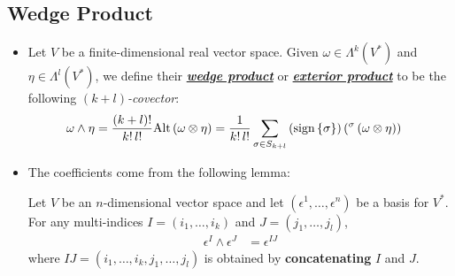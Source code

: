 \documentclass[11pt]{article}
\begin{document}
\subsection{Wedge Product}
\begin{itemize}
\item \begin{definition}
Let $V$ be a finite-dimensional real vector space. Given $\omega \in \Lambda^k(V^{*})$ and $\eta \in \Lambda^l(V^{*})$, we define their \underline{\emph{\textbf{wedge product}}} or \underline{\emph{\textbf{exterior product}}} to be the following \emph{$(k+ l)$-covector}:
\begin{align}
\omega \wedge \eta &= \frac{(k+l)!}{k! \,l!}\text{Alt}\left(\omega \otimes \eta \right) =   \frac{1}{k! \,l!}\sum_{\sigma \in S_{k+l}} \left(\text{sign}\left\{\sigma\right\}\right)\left(^{\sigma}\left(\omega \otimes \eta \right)\right)  \label{eqn: wedge_product}
\end{align}
\end{definition}


\item The coefficients come from the following lemma:
\begin{lemma}
Let $V$ be an $n$-dimensional vector space and let $(\epsilon^1,\ldots, \epsilon^n)$ be a basis for $V^{*}$. For any multi-indices $I=(i_1,\ldots, i_k)$ and $J=(j_1,\ldots, j_l)$,
\begin{align}
\epsilon^{I} \wedge \epsilon^{J} &= \epsilon^{IJ} \label{eqn: wedge_product_of_basis}
\end{align}
where $IJ= (i_1,\ldots, i_k, j_1,\ldots, j_l)$ is obtained by \textbf{concatenating} $I$ and $J$.
\end{lemma}


\end{itemize}
\end{document}
